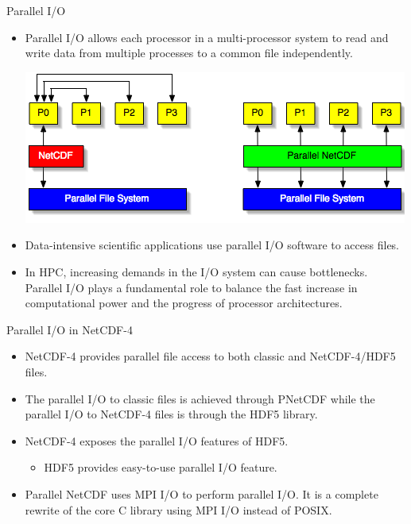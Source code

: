 \documentclass[compress,11pt,xcolor=svgnames,aspectratio=169]{beamer}
\begin{document}
\begin{frame}[fragile]{Parallel I/O}

\begin{itemize}
\setlength\itemsep{0.2cm}

  \item Parallel I/O allows each processor in a multi-processor system to read and write data from multiple processes to a common file independently.

  \begin{center}
  \includegraphics[scale=0.5]{fig/pnetcdf}
  \end{center}

  \item Data-intensive scientific applications use parallel I/O software to access files.

  \item In HPC, increasing demands in the I/O system can cause bottlenecks. Parallel I/O plays a fundamental role to balance the fast increase in computational power and the progress of processor architectures.

\end{itemize}

\end{frame}

\begin{frame}[fragile]{Parallel I/O in NetCDF-4}

\begin{itemize}
\setlength\itemsep{0.6cm}

  \item NetCDF-4 provides parallel file access to both classic and NetCDF-4/HDF5 files.

  \item The parallel I/O to classic files is achieved through PNetCDF while the parallel I/O to NetCDF-4 files is through the HDF5 library.

  \item NetCDF-4 exposes the parallel I/O features of HDF5.
    \begin{itemize}
    \item HDF5 provides easy-to-use parallel I/O feature.
    \end{itemize}

  \item Parallel NetCDF uses MPI I/O to perform parallel I/O. It is a complete rewrite of the core C library using MPI I/O instead of POSIX.

\end{itemize}

\end{frame}
\end{document}
